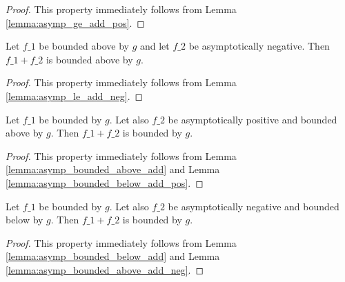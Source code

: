 \begin{proof}
    \leanok
    This property immediately follows from Lemma \ref{lemma:asymp_ge_add_pos}.
\end{proof}

\begin{lemma}
    \label{lemma:asymp_bounded_above_add_neg}
    \leanok
    Let $f\_1$ be bounded above by $g$ and let $f\_2$ be asymptotically negative. 
    Then $f\_1 + f\_2$ is bounded above by $g$.
\end{lemma}

\begin{proof}
    \leanok
    This property immediately follows from Lemma \ref{lemma:asymp_le_add_neg}.
\end{proof}

\begin{lemma}
    \label{lemma:asymp_bounded_add_pos_above}
    \leanok
    Let $f\_1$ be bounded by $g$. Let also $f\_2$ be asymptotically positive and
    bounded above by $g$. Then $f\_1 + f\_2$ is bounded by $g$.
\end{lemma}

\begin{proof}
    \leanok
    This property immediately follows from Lemma \ref{lemma:asymp_bounded_above_add}
    and Lemma \ref{lemma:asymp_bounded_below_add_pos}.
\end{proof}

\begin{lemma}
    \label{lemma:asymp_bounded_add_neg_below}
    \leanok
    Let $f\_1$ be bounded by $g$. Let also $f\_2$ be asymptotically negative and
    bounded below by $g$. Then $f\_1 + f\_2$ is bounded by $g$.
\end{lemma}

\begin{proof}
    \leanok
    This property immediately follows from Lemma \ref{lemma:asymp_bounded_below_add}
    and Lemma \ref{lemma:asymp_bounded_above_add_neg}.
\end{proof}

